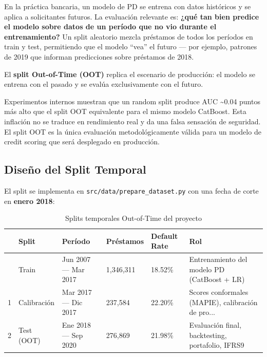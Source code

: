 \documentclass[
  spanish,
  11pt,
  letterpaper,
]{scrbook}
\theoremstyle{plain}
\theoremstyle{remark}
\begin{document}
En la práctica bancaria, un modelo de PD se entrena con datos históricos
y se aplica a solicitantes futuros. La evaluación relevante es:
\textbf{¿qué tan bien predice el modelo sobre datos de un período que no
vio durante el entrenamiento?} Un split aleatorio mezcla préstamos de
todos los períodos en train y test, permitiendo que el modelo ``vea'' el
futuro --- por ejemplo, patrones de 2019 que informan predicciones sobre
préstamos de 2018.

El \textbf{split Out-of-Time (OOT)} replica el escenario de producción:
el modelo se entrena con el pasado y se evalúa exclusivamente con el
futuro.

\begin{tcolorbox}[enhanced jigsaw, arc=.35mm, bottomrule=.15mm, bottomtitle=1mm, breakable, colback=white, colbacktitle=quarto-callout-warning-color!10!white, colframe=quarto-callout-warning-color-frame, coltitle=black, left=2mm, leftrule=.75mm, opacityback=0, opacitybacktitle=0.6, rightrule=.15mm, title=\textcolor{quarto-callout-warning-color}{\faExclamationTriangle}\hspace{0.5em}{Random split infla el AUC}, titlerule=0mm, toprule=.15mm, toptitle=1mm]

Experimentos internos muestran que un random split produce AUC
\textasciitilde0.04 puntos más alto que el split OOT equivalente para el
mismo modelo CatBoost. Esta inflación no se traduce en rendimiento real
y da una falsa sensación de seguridad. El split OOT es la única
evaluación metodológicamente válida para un modelo de credit scoring que
será desplegado en producción.

\end{tcolorbox}

\subsection{Diseño del Split
Temporal}\label{diseuxf1o-del-split-temporal}

El split se implementa en \texttt{src/data/prepare\_dataset.py} con una
fecha de corte en \textbf{enero 2018}:

{

\begin{longtable}[]{@{}llllll@{}}

\caption{\label{tbl-temporal-splits}Splits temporales Out-of-Time del
proyecto}

\tabularnewline

\toprule\noalign{}
& Split & Período & Préstamos & Default Rate & Rol \\
\midrule\noalign{}
\endhead
\bottomrule\noalign{}
\endlastfoot
0 & Train & Jun 2007 --- Mar 2017 & 1,346,311 & 18.52\% & Entrenamiento
del modelo PD (CatBoost + LR) \\
1 & Calibración & Mar 2017 --- Dic 2017 & 237,584 & 22.20\% & Scores
conformales (MAPIE), calibración de pro... \\
2 & Test (OOT) & Ene 2018 --- Sep 2020 & 276,869 & 21.98\% & Evaluación
final, backtesting, portafolio, IFRS9 \\

\end{longtable}

}
\end{document}
